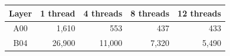 \begin{tabular}{crrrr}
\hline
\rowcolor{headgrey}
\textbf{Layer} & \textbf{1 thread} & \textbf{4 threads} & \textbf{8 threads} & \textbf{12 threads} \\ \hline
A00 & 1{,}610 & 553 & 437 & 433 \\
B04 & 26{,}900 & 11{,}000 & 7{,}320 & 5{,}490 \\
\hline
\end{tabular}
